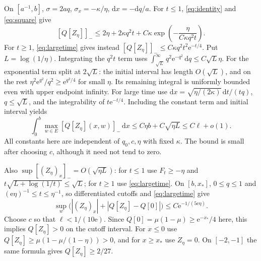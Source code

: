 \documentclass[11pt]{article}
\theoremstyle{remark}
\newcommand{\negpart}[1]{[#1]_-}
\begin{document}
On $[a^{-1},b]$, $\sigma=2aq$, $\sigma_x=-\kappa/\eta$,
$\mathrm dx=-\mathrm dq/a$. For $t\leq1$, \eqref{eq:identity} and
\eqref{eq:square} give
\[
 \negpart{Q[Z_\eta]}\leq
 2\eta+2\kappa q^2t+C\kappa\exp\left(-\frac\eta{C\kappa q^2t}\right).
\]
For $t\geq1$, \eqref{eq:largetime} gives instead
$\negpart{Q[Z_\eta]}\leq C\kappa q^2t^2\mathrm e^{-t/4}$.
Put $L=\log(1/\eta)$. Integrating the $q^2t$ term uses
$\int_{\sqrt L}^\infty q^2\mathrm e^{-q^2}\,\mathrm dq\leq C\sqrt L\eta$.
For the exponential term split at $2\sqrt L$: the initial interval has
length $O(\sqrt L)$, and on the rest
$\eta^2\mathrm e^{q^2}/q^2\geq\mathrm e^{q^2/4}$ for small $\eta$.
Its remaining integral is uniformly bounded even with upper endpoint infinity.
For large time use
$\mathrm dx=\sqrt{\eta/(2\kappa)}\,\mathrm dt/(tq)$,
$q\leq\sqrt L$, and the integrability of $t\mathrm e^{-t/4}$.
Including the constant term and initial interval yields
\begin{equation}\label{eq:defect}
 \int_0^b\max_{w\in E}\negpart{Q[Z_\eta](x,w)}\,\mathrm dx
       \leq C\eta b+C\sqrt{\eta L}\leq C\ell+o(1).
\end{equation}
All constants here are independent of $q_0,c,\eta$ with fixed $\kappa$.
The bound is small after choosing $c$, although it need not tend to zero.

Also $\sup\negpart{(Z_\eta)_x}=O(\sqrt{\eta L})$:
for $t\leq1$ use $F_t\geq-\eta$ and
$t\sqrt{L+\log(1/t)}\leq\sqrt L$; for $t\geq1$ use \eqref{eq:largetime}.
On $[b,x_*]$, $0\leq q\leq1$ and $(\mathrm e\eta)^{-1}\leq t\leq\eta^{-1}$,
so differentiated cutoffs and \eqref{eq:largetime} give
\[
 \sup_w\bigl(|(Z_\eta)_x|+|Q[Z_\eta]-Q[0]|\bigr)
       \leq C\mathrm e^{-1/(5\mathrm e\eta)}.
\]
Choose $c$ so that $\ell<1/(10\mathrm e)$. Since
$Q[0]=\mu(1-\mu)\geq\mathrm e^{-x_*}/4$ here, this implies $Q[Z_\eta]>0$
on the cutoff interval. For $x\leq0$ use
$Q[Z_\eta]\geq\mu(1-\mu/(1-\eta))>0$, and for $x\geq x_*$ use $Z_\eta=0$.
On $[-2,-1]$ the same formula gives $Q[Z_\eta]\geq2/27$.
\end{document}
